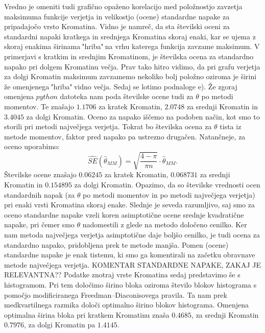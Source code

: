 \documentclass{article}
\begin{document}
Vredno je omeniti tudi grafično opaženo korelacijo med položnostjo zavzetja maksimuma funkcije verjetja in velikostjo (ocene) standardne napake za pripadajočo vrsto Kromatina.
Vidno je namreč, da sta številski oceni za standardni napaki kratkega in srednjega Kromatina skoraj enaki, kar se ujema z skoraj enakima širinama$~$"hriba"$~$na vrhu katerega funkcija zavzame maksimum. 
V primerjavi s kratkim in srednjim Kromatinom, je številska ocena za standardno napako pri dolgem Kromatinu večja. Prav tako hitro vidimo, da pri grafu verjetja za dolgi Kromatin maksimum zavzamemo nekoliko bolj položno oziroma je širini že omenjenega$~$"hriba"$~$vidno večja.
\newline
\newline
Sedaj se lotimo podnaloge e). Že zgoraj omenjena $python$ datoteka nam poda številske ocene tudi za $\theta$ po metodi momentov. 
Te znašajo $1.1706$ za kratek Kromatin, $2.0748$ za srednji Kromatin in $3.4045$ za dolgi Kromatin.
Oceno za napako iščemo na podoben način, kot smo to storili pri metodi največjega verjetja. Tokrat bo številska ocena za $\theta$ tista iz metode momentov, faktor pred napako pa ustrezno drugačen. Natančneje, za oceno uporabimo:
$$
    \hat{SE}(\hat{\theta}_{MM}) = \sqrt{\frac{4 - \pi}{\pi n}} \cdot\hat{\theta}_{MM}.
$$
Številske ocene znašajo $0.06245$ za kratek Kromatin, $0.068731$ za srednji Kromatin in $0.154895$ za dolgi Kromatin.
\newline
Opazimo, da so številske vrednosti ocen standardnih napak (za $\theta$ po metodi momentov in po metodi največjega verjetja) pri enaki vrsti Kromatina skoraj enake. 
Slednje je seveda razumljivo, saj smo za oceno standardne napake vzeli koren asimptotične ocene srednje kvadratične napake, pri čemer smo $\theta$ nadomestili z glede na metodo določeno cenilko. 
Ker nam metoda največjega verjetja asimptotične daje boljšo cenilko, je tudi ocena za standardno napako, pridobljena prek te metode manjša. 
Pomen (ocene) standardne napake je enak tistemu, ki smo ga komentirali na začetku obravnave metode največjega verjetja.
\newline
\newline
KOMENTAR STANDARDNE NAPAKE, ZAKAJ JE RELEVANTNA??
\newline
\newline
Podatke znotraj vrste Kromatina sedaj predstavimo še s histogramom. Pri tem določimo širino bloka oziroma število blokov histograma s pomočjo modificiranega Freedman–Diaconisovega pravila. 
Ta nam prek medkvartilnega razmika določi optimalno širino blokov histograma. Omenjena optimalna širina bloka pri kratkem Kromatinu znaša $0.4685$, za srednji Kromatin $0.7976$, za dolgi Kromatin pa $1.4145$.
\end{document}
